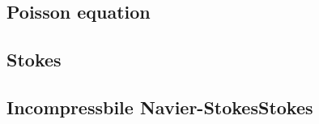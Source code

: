 
\subsection{Poisson equation}

\subsection{Stokes}

\subsection{Incompressbile Navier-StokesStokes}

